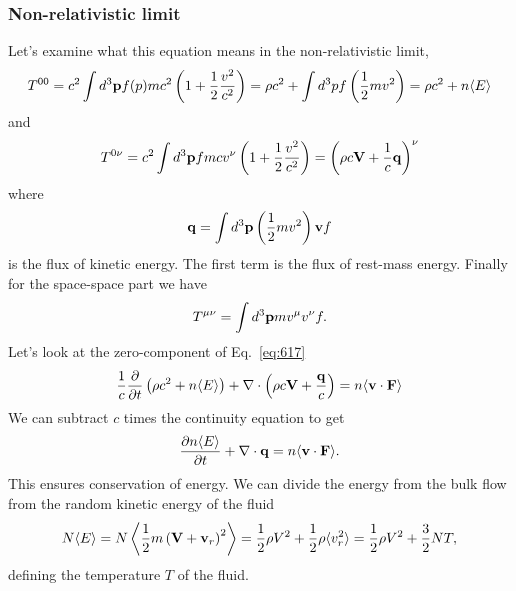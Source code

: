 \subsubsection{Non-relativistic limit}
\label{sec:non-relat-limit}

Let's examine what this equation means in the non-relativistic limit,
\begin{equation}
T^{00} = c^2 \int d^3 {\bf p} f(p) m c^2 \left ( 1 +
\frac{1}{2}\frac{v^2}{c^2} \right )= \rho c^2 + \int d^3 p f \left (
\frac{1}{2} m v^2 \right ) = \rho c^2 + n \langle E \rangle
\label{eq:618}
\end{equation}
and
\begin{equation}
T^{0\nu} = c^2 \int d^3 {\bf p} f m c v^\nu \left ( 1 +
\frac{1}{2}\frac{v^2}{c^2}\right ) = \left ( \rho c {\bf V} +
\frac{1}{c} {\bf q} \right )^{\nu}
\label{eq:619}
\end{equation}
where
\begin{equation}
{\bf q} = \int d^3 {\bf p} \left ( \frac{1}{2} m v^2 \right ) {\bf v} f
\label{eq:620}
\end{equation}
is the flux of kinetic energy.  The first term is the flux of
rest-mass energy.  Finally for the space-space part we have
\begin{equation}
T^{\mu\nu} = \int d^3{\bf p} m v^\mu v^\nu f.
\label{eq:621}
\end{equation}
Let's look at the zero-component of Eq.~\ref{eq:617} 
\begin{equation}
\frac{1}{c} \frac{\partial {}}{\partial {t}} \left ( \rho c^2 + n \langle E \rangle \right ) + \nabla
\cdot \left ( \rho c {\bf V} + \frac{\bf q}{c} \right ) = n \langle
      {\bf v} \cdot {\bf F} \rangle
\label{eq:622}
\end{equation}
We can subtract $c$ times the continuity equation to get
\begin{equation}
\frac{\partial {n \langle E \rangle}}{\partial {t}} + \nabla \cdot {\bf q} = n \langle
      {\bf v} \cdot {\bf F} \rangle.
\label{eq:623}
\end{equation}
This ensures conservation of energy.  We can divide the energy from
the bulk flow from the random kinetic energy of the fluid
\begin{equation}
N \langle E \rangle = N \left \langle \frac{1}{2} m \left ( {\bf V} + {\bf v}_r
\right )^2 \right \rangle = \frac{1}{2} \rho V^2 + \frac{1}{2} \rho
\langle v_r^2 \rangle = \frac{1}{2} \rho V^2 + \frac{3}{2} N T,
\label{eq:624}
\end{equation}
defining the temperature $T$ of the fluid.


